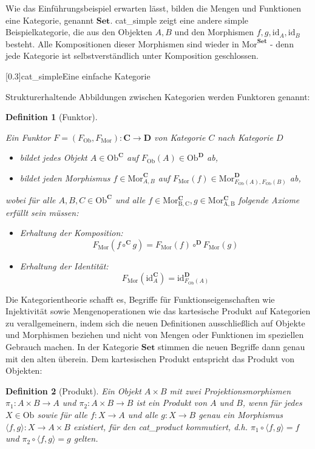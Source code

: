 \documentclass[a4paper, bibgerm]{article}
\newcommand\abb{}
\newcommand\fig{}
\newcommand\ato{\rightarrow}
\newtheorem{defini}{Definition}
\newcommand{\defi}[2]{%
  \begin{defini}[#1]
    \label{def:#1}
    #2
  \end{defini}
}
\begin{document}
Wie das Einführungsbeispiel erwarten lässt, bilden die Mengen und
Funktionen eine Kategorie, genannt $\mathbf{Set}$. \abb{cat_simple} zeigt eine
andere simple Beispielkategorie, die aus den Objekten $A, B$ und den
Morphismen $f, g, \mathrm{id}_A, \mathrm{id}_B$ besteht. Alle Kompositionen
dieser Morphismen sind wieder in $\mathrm{Mor}^{\mathbf{Set}}$ - denn
jede Kategorie ist selbstverständlich unter Komposition geschlossen.

\fig[0.3]{cat_simple}{Eine einfache Kategorie}

Strukturerhaltende Abbildungen zwischen Kategorien werden Funktoren genannt:

\defi{Funktor}{
Ein Funktor $F=(F_{\mathrm{Ob}},F_{\mathrm{Mor}}) : \mathbf{C}
\rightarrow \mathbf{D}$ von Kategorie $C$ nach Kategorie $D$  
    \begin{itemize}
    \item bildet jedes Objekt $A \in \mathrm{Ob}^{\mathbf{C}}$ auf $F_{\mathrm{Ob}}(A) \in
      \mathrm{Ob}^{\mathbf{D}}$ ab, 
    \item bildet jeden Morphismus $f \in
      \mathrm{Mor}^{\mathbf{C}}_{A,B}$ auf $F_{\mathrm{Mor}}(f) \in
      \mathrm{Mor}^{\mathbf{D}}_{F_{\mathrm{Ob}}(A),F_{\mathrm{Ob}}(B)}$
      ab,
    \end{itemize}   
    wobei für alle $A,B,C \in \mathrm{Ob}^{\mathbf{C}}$ und alle $f \in
    \mathrm{Mor^{\mathbf{C}}_{B,C}},g \in
    \mathrm{Mor^{\mathbf{C}}_{A,B}}$ folgende Axiome erfüllt sein 
    müssen: 
    \begin{itemize}
    \item Erhaltung der Komposition:
      $$F_{\mathrm{Mor}}(f \circ^{\mathbf{C}} g) =
      F_{\mathrm{Mor}}(f) \circ^{\mathbf{D}} F_{\mathrm{Mor}}(g)$$
    \item Erhaltung der Identität:
      $$F_{\mathrm{Mor}}(\mathrm{id}^{\mathbf{C}}_A) =
      \mathrm{id}^{\mathbf{D}}_{F_{\mathrm{Ob}}(A)}$$
    \end{itemize}
}

Die Kategorientheorie schafft es, Begriffe für Funktionseigenschaften
wie Injektivität sowie Mengenoperationen wie das kartesische Produkt auf
Kategorien zu verallgemeinern, indem sich die neuen Definitionen
ausschließlich auf Objekte und Morphismen beziehen und nicht von Mengen
oder Funktionen im speziellen Gebrauch machen. In der Kategorie
$\mathbf{Set}$ stimmen die neuen Begriffe dann genau mit den alten
überein. Dem kartesischen Produkt entspricht das Produkt von Objekten:

\defi{Produkt}{ Ein Objekt $A \times B$ mit zwei Projektionsmorphismen
  $\pi_1 : A \times B \ato A$ und $\pi_2 : A \times B \ato B$ ist ein
  Produkt von $A$ und $B$, wenn für jedes $X \in \mathrm{Ob}$ sowie für
  alle $f : X \ato A$ und alle $g : X \ato B$ genau ein Morphismus
  $\langle f,g \rangle : X \ato A \times B$ existiert, für den
  \abb{cat_product} kommutiert, d.h.  $\pi_1 \circ \langle f,g \rangle =
  f$ und $\pi_2 \circ \langle f,g \rangle = g$ gelten.  }
\end{document}
